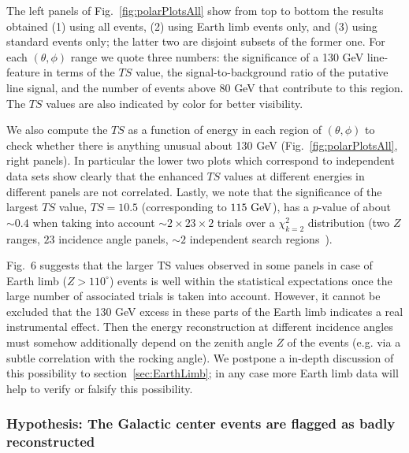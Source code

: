 \documentclass[aps,twocolumn,prd,superscriptaddress,showpacs,nofootinbib,fixfloat]{revtex4}
\newcommand{\GeV}{{\rm ~GeV}}
\begin{document}
The left panels of Fig.~\ref{fig:polarPlotsAll} show from
top to bottom the results obtained (1) using all events, (2)
using Earth limb events only, and (3) using standard events
only; the latter two are disjoint subsets of the
former one. For each $(\theta, \phi)$ range we quote three
numbers: the significance of a 130 GeV line-feature in terms
of the $TS$ value, the signal-to-background ratio of the
putative line signal, and the number of events above 80 GeV
that contribute to this region. The $TS$ values are also
indicated by color for better visibility.


We also compute the $TS$ as a function of energy in each region of
$(\theta,\phi)$ to check whether there is anything unusual about 130 GeV
(Fig.~\ref{fig:polarPlotsAll}, right panels). In
particular the lower two plots which correspond to
independent data sets show clearly that the enhanced $TS$
values at different energies in different panels are not
correlated. Lastly, we note that the significance of the
largest $TS$ value, $TS=10.5$ (corresponding to $115\GeV$), has a $p$-value of
about $\sim0.4$ when taking into account
$\sim2\times23\times2$ trials over a $\chi_{k=2}^2$ distribution
(two $Z$ ranges, $23$ incidence angle panels, $\sim2$
independent search regions~\cite{Gross:2010qma}). 

Fig.~6 suggests that the larger TS values observed in some panels in case of
Earth limb ($Z>110^\circ$) events is well within the statistical expectations
once the large number of associated trials is taken into account.
However, it cannot be excluded that the 130 GeV excess in
these parts of the Earth limb indicates a real instrumental
effect. Then the energy
reconstruction at different incidence angles must somehow
additionally
depend on the zenith angle $Z$ of the events
(e.g. via a
subtle correlation with the rocking angle).
We postpone a in-depth discussion of this possibility to
section~\ref{sec:EarthLimb}; in any case more
Earth limb data will help to verify or falsify this possibility.

\subsubsection{Hypothesis: The Galactic center events are flagged as badly
reconstructed}
\end{document}
